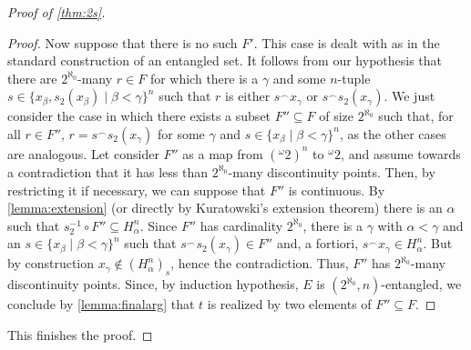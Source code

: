 \documentclass[12pt]{amsart}
\theoremstyle{definition}
\theoremstyle{remark}
\begin{document}
\begin{proof}[Proof of \cref{thm:2s}]
\begin{proof}
Now suppose that there is no such $F'$. This case is dealt with as in the standard construction of an entangled set. It follows from our hypothesis that there are $2^{\aleph_0}$-many $r \in F$ for which there is a $\gamma$ and some $n$-tuple $s \in \{x_\beta, s_2(x_\beta) \mid \beta < \gamma\}^n$ such that $r$ is either $s^\smallfrown x_\gamma$ or $s^\smallfrown s_2(x_\gamma)$. We just consider the case in which there exists a subset $F'' \subseteq F$ of size $2^{\aleph_0}$ such that, for all $r \in F''$, $r = s^\smallfrown s_2(x_\gamma)$ for some $\gamma$ and $s \in \{x_\beta \mid \beta < \gamma\}^n$, as the other cases are analogous. Let  consider $F''$ as a map from $({}^\omega 2)^n$ to ${}^\omega 2$, and assume towards a contradiction that it has less than $2^{\aleph_0}$-many discontinuity points. Then, by restricting it if necessary, we can suppose that $F''$ is continuous. By \cref{lemma:extension} (or directly by Kuratowski's extension theorem) there is an $\alpha$ such that $s_2^{-1} \circ F'' \subseteq H_\alpha^n$. Since $F''$ has cardinality $2^{\aleph_0}$, there is a $\gamma$ with $\alpha < \gamma$ and an $s \in \{x_\beta \mid \beta < \gamma\}^n$ such that $s^\smallfrown s_2(x_\gamma) \in F''$ and, a fortiori, $s^\smallfrown x_\gamma \in H^n_\alpha$. But by construction $x_\gamma \not\in (H^n_\alpha)_s$, hence the contradiction. Thus, $F''$ has $2^{\aleph_0}$-many discontinuity points. Since, by induction hypothesis, $E$ is $(2^{\aleph_0}, n)$-entangled, we conclude by \cref{lemma:finalarg} that $t$ is realized by two elements of $F''\subseteq F$.
\end{proof}
This finishes the proof.
\end{proof}
\end{document}
